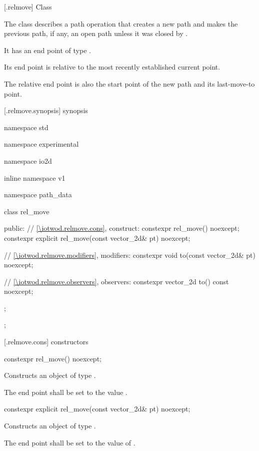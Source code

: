  [\iotwod.relmove] {Class }

\pnum
{}
The class  describes a path operation that creates a new path and makes the previous path, if any, an open path unless it was closed by .

\pnum
It has an end point of type .

\pnum
Its end point is relative to the most recently established current point.

\pnum
The relative end point is also the start point of the new path and its last-move-to point.

 [\iotwod.relmove.synopsis] { synopsis}

\begin{codeblock}
namespace std { namespace experimental { namespace io2d { inline namespace v1 {
  namespace path_data {
    class rel_move {
    public:
      // \ref{\iotwod.relmove.cons}, construct:
      constexpr rel_move() noexcept;
      constexpr explicit rel_move(const vector_2d& pt) noexcept;

      // \ref{\iotwod.relmove.modifiers}, modifiers:
      constexpr void to(const vector_2d& pt) noexcept;

      // \ref{\iotwod.relmove.observers}, observers:
      constexpr vector_2d to() const noexcept;
    };
  };
} } } }
\end{codeblock}

 [\iotwod.relmove.cons] { constructors}

\begin{itemdecl}
constexpr rel_move() noexcept;
\end{itemdecl}
\begin{itemdescr}
\pnum
\effects
Constructs an object of type .

\pnum
The end point shall be set to the value .
\end{itemdescr}

\begin{itemdecl}
constexpr explicit rel_move(const vector_2d& pt) noexcept;
\end{itemdecl}
\begin{itemdescr}
\pnum
\effects
Constructs an object of type .

\pnum
The end point shall be set to the value of .
\end{itemdescr}

